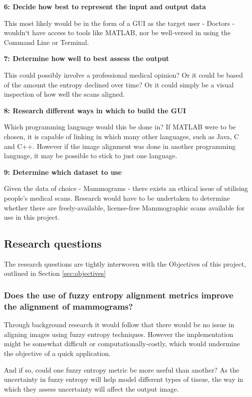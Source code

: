 \noindent \textbf{6: Decide how best to represent the input and output data}

This most likely would be in the form of a \acrshort{GUI} as the target user - Doctors - wouldn`t have access to tools like MATLAB, nor be well-versed in using the Command Line or Terminal.

\noindent \textbf{7: Determine how well to best assess the output}

This could possibly involve a professional medical opinion? Or it could be based of the amount the entropy declined over time? Or it could simply be a visual inspection of how well the scans aligned.

\noindent \textbf{8: Research different ways in which to build the \acrshort{GUI}}

Which programming language would this be done in? If MATLAB were to be chosen, it is capable of linking in which many other languages, such as Java, C and C++. However if the image alignment was done in another programming language, it may be possible to stick to just one language.

\noindent \textbf{9: Determine which dataset to use}

Given the data of choice - Mammograms - there exists an ethical issue of utilising people's medical scans. Research would have to be undertaken to determine whether there are freely-available, license-free Mammographic scans available for use in this project.

\subsection{Research questions}
\label{ssec:research-qs}

The research questions are tightly interwoven with the Objectives of this project, outlined in Section \ref{sec:objectives}

\subsubsection{Does the use of fuzzy entropy alignment metrics improve the alignment of mammograms?}

Through background research it would follow that there would be no issue in aligning images using fuzzy entropy techniques. However the implementation might be somewhat difficult or computationally-costly, which would undermine the objective of a quick application.

And if so, could one fuzzy entropy metric be more useful than another? As the uncertainty in fuzzy entropy will help model different types of tissue, the way in which they assess uncertainty will affect the output image.

